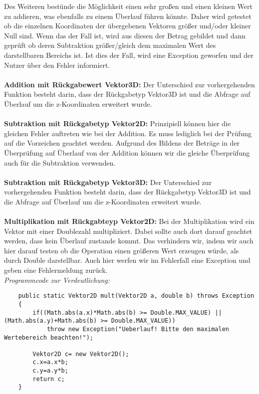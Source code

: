 \documentclass[a4paper,11pt]{scrartcl}
\begin{document}
Des Weiteren bestünde die Möglichkeit einen sehr großen und einen kleinen Wert zu addieren, was ebenfalls zu einem Überlauf führen könnte. Daher wird getestet ob die einzelnen Koordinaten der übergebenen Vektoren größer und/oder kleiner Null sind. Wenn das der Fall ist, wird aus diesen der Betrag gebildet und dann geprüft ob deren Subtraktion größer/gleich dem maximalen Wert des darstellbaren Bereichs ist. Ist dies der Fall, wird eine Exception geworfen und der Nutzer über den Fehler informiert.\\
\\
\textbf{Addition mit Rückgabewert Vektor3D:} Der Unterschied zur vorhergehenden Funktion besteht darin, dass der Rückgabetyp Vektor3D ist und die Abfrage auf Überlauf um die z-Koordinaten erweitert wurde.\\
\\
\textbf{Subtraktion mit Rückgabetyp Vektor2D:} Prinzipiell können hier die gleichen Fehler auftreten wie bei der Addition. Es muss lediglich bei der Prüfung auf die Vorzeichen geachtet werden. Aufgrund des Bildens der Beträge in der Überprüfung auf Überlauf von der Addition können wir die gleiche Überprüfung auch für die Subtraktion verwenden.\\
\\
\textbf{Subtraktion mit Rückgabetyp Vektor3D:} Der Unterschied zur vorhergehenden Funktion besteht darin, dass der Rückgabetyp Vektor3D ist und die Abfrage auf Überlauf um die z-Koordinaten erweitert wurde.\\
\\
\textbf{Multiplikation mit Rückgabteyp Vektor2D:} Bei der Multiplikation wird ein Vektor mit einer Doublezahl multipliziert. Dabei sollte auch dort darauf geachtet werden, dass kein Überlauf zustande kommt. Das verhindern wir, indem wir auch hier darauf testen ob die Operation einen größeren Wert erzeugen würde, als durch Double darstellbar. Auch hier werfen wir im Fehlerfall eine Exception und geben eine Fehlermeldung zurück.\\
\textit{Programmcode zur Verdeutlichung:}
\begin{lstlisting}
	public static Vektor2D mult(Vektor2D a, double b) throws Exception
	{
		if((Math.abs(a.x)*Math.abs(b) >= Double.MAX_VALUE) || (Math.abs(a.y)+Math.abs(b) >= Double.MAX_VALUE))
			throw new Exception("Ueberlauf! Bitte den maximalen Wertebereich beachten!");
		
		Vektor2D c= new Vektor2D();
		c.x=a.x*b;
		c.y=a.y*b;
		return c;
	}
\end{lstlisting} $\;$ \\
\end{document}
